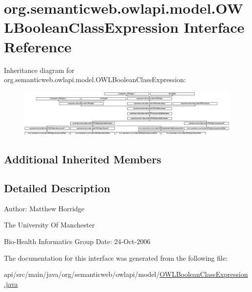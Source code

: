 \hypertarget{interfaceorg_1_1semanticweb_1_1owlapi_1_1model_1_1_o_w_l_boolean_class_expression}{\section{org.\-semanticweb.\-owlapi.\-model.\-O\-W\-L\-Boolean\-Class\-Expression Interface Reference}
\label{interfaceorg_1_1semanticweb_1_1owlapi_1_1model_1_1_o_w_l_boolean_class_expression}
}
Inheritance diagram for org.\-semanticweb.\-owlapi.\-model.\-O\-W\-L\-Boolean\-Class\-Expression\-:\begin{figure}[H]
\begin{center}
\leavevmode
\includegraphics[height=2.394299cm]{interfaceorg_1_1semanticweb_1_1owlapi_1_1model_1_1_o_w_l_boolean_class_expression}
\end{center}
\end{figure}
\subsection*{Additional Inherited Members}


\subsection{Detailed Description}
Author\-: Matthew Horridge\par
 The University Of Manchester\par
 Bio-\/\-Health Informatics Group Date\-: 24-\/\-Oct-\/2006 

The documentation for this interface was generated from the following file\-:\begin{DoxyCompactItemize}
\item 
api/src/main/java/org/semanticweb/owlapi/model/\hyperlink{_o_w_l_boolean_class_expression_8java}{O\-W\-L\-Boolean\-Class\-Expression.\-java}\end{DoxyCompactItemize}
